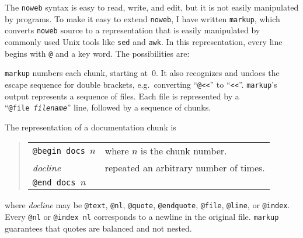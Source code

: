 The \verb+noweb+ syntax is easy to read, write, and edit, but it is
not easily manipulated by programs.
To make it easy to extend \verb+noweb+, I have written
\verb+markup+, which converts \verb+noweb+ source to
 a representation that is easily manipulated
by commonly used Unix tools like {\tt sed} and {\tt awk}.
In this representation,
every line begins with {\tt @} and a key word.
The possibilities are:
\begin{quote}
\leavevmode{}
\end{quote}
{\tt markup} numbers each chunk, starting at~0.
It also recognizes and undoes the escape sequence for double brackets,
e.g.~converting ``{\tt @<<}'' to ``{\tt <<}''.
{\tt markup}'s output represents a sequence of files.
Each file is represented by a ``{\tt @file~{\rm\it filename}}'' line,
followed by a sequence of chunks.

The representation of a documentation chunk is
\begin{quote}
\begin{tabular}{ll}
\tt @begin docs $n$&where $n$ is the chunk number.\\
{\it docline}&repeated an arbitrary number of times.\\
\tt @end docs $n$
\end{tabular}
\end{quote}
where {\it docline} may be {\tt @text}, {\tt @nl}, {\tt @quote},
{\tt @endquote}, {\tt @file}, {\tt @line}, or {\tt @index}.
Every {\tt @nl} or {\tt @index~nl} corresponds to a newline in the original file.
{\tt markup} guarantees that quotes are balanced and not nested.

